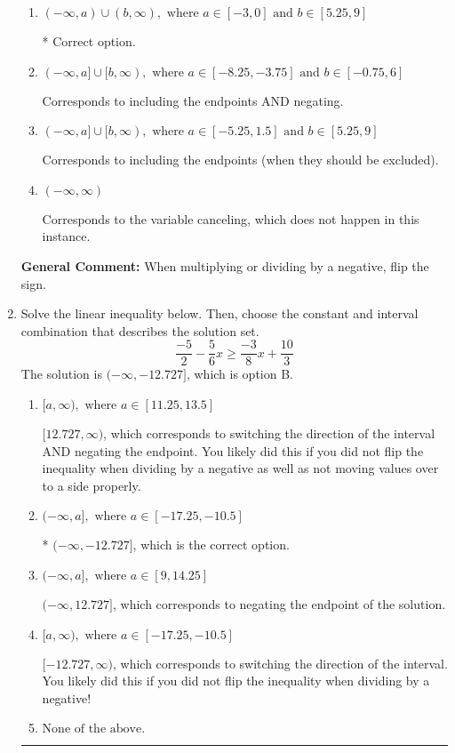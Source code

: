 \documentclass{extbook}[14pt]
\newcommand{\litem}[1]{\item #1

\rule{\textwidth}{0.4pt}}
\begin{document}
\begin{enumerate}
{\begin{enumerate}[label=\Alph*.]
Corresponds to inverting the inequality and negating the solution.
\item \( (-\infty, a) \cup (b, \infty), \text{ where } a \in [-3, 0] \text{ and } b \in [5.25, 9] \)

 * Correct option.
\item \( (-\infty, a] \cup [b, \infty), \text{ where } a \in [-8.25, -3.75] \text{ and } b \in [-0.75, 6] \)

Corresponds to including the endpoints AND negating.
\item \( (-\infty, a] \cup [b, \infty), \text{ where } a \in [-5.25, 1.5] \text{ and } b \in [5.25, 9] \)

Corresponds to including the endpoints (when they should be excluded).
\item \( (-\infty, \infty) \)

Corresponds to the variable canceling, which does not happen in this instance.
\end{enumerate}

\textbf{General Comment:} When multiplying or dividing by a negative, flip the sign.
}
\litem{
Solve the linear inequality below. Then, choose the constant and interval combination that describes the solution set.
\[ \frac{-5}{2} - \frac{5}{6} x \geq \frac{-3}{8} x + \frac{10}{3} \]The solution is \( (-\infty, -12.727] \), which is option B.\begin{enumerate}[label=\Alph*.]
\item \( [a, \infty), \text{ where } a \in [11.25, 13.5] \)

 $[12.727, \infty)$, which corresponds to switching the direction of the interval AND negating the endpoint. You likely did this if you did not flip the inequality when dividing by a negative as well as not moving values over to a side properly.
\item \( (-\infty, a], \text{ where } a \in [-17.25, -10.5] \)

* $(-\infty, -12.727]$, which is the correct option.
\item \( (-\infty, a], \text{ where } a \in [9, 14.25] \)

 $(-\infty, 12.727]$, which corresponds to negating the endpoint of the solution.
\item \( [a, \infty), \text{ where } a \in [-17.25, -10.5] \)

 $[-12.727, \infty)$, which corresponds to switching the direction of the interval. You likely did this if you did not flip the inequality when dividing by a negative!
\item \( \text{None of the above}. \)


\end{enumerate}}
\end{enumerate}
\end{document}
